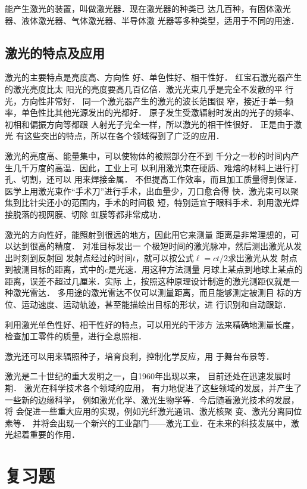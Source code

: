 能产生激光的装置，叫做激光器．现在激光器的种类已
达几百种，有固体激光器、液体激光器、气体激光器、半导体激
光器等多种类型，适用于不同的用途．

\subsection{激光的特点及应用}

激光的主要特点是亮度高、方向性
好、单色性好、相干性好．
红宝石激光器产生的激光亮度比太
阳光的亮度要高几百亿倍．激光光束几乎是完全不发散的平
行光，方向性非常好．
同一个激光器产生的激光的波长范围很
窄，接近于单一频率，单色性比其他光源发出的光都好．
原子发生受激辐射时发出的光子的频率、初相和偏振方向等都跟
人射光子完全一样，所以激光的相干性很好．
正是由于激光
有这些突出的特点，所以在各个领域得到了广泛的应用．

激光的亮度高、能量集中，可以使物体的被照部分在不到
千分之一秒的时间内产生几千万度的高温．因此，工业上可
以利用激光束在硬质、难熔的材料上进行打孔、切割，还可以
用来焊接金属．
不但提高工作效率，而且加工质量得到保证．
医学上用激光束作“手术刀”进行手术，出血量少，刀口愈合得
快．激光束可以聚焦到比针尖还小的范围内，手术的时间极
短，特别适宜于眼科手术．利用激光焊接脱落的视网膜、切除
虹膜等都非常成功．

激光的方向性好，能照射到很远的地方，因此用它来测量
距离是非常理想的，可以达到很高的精度．
对准目标发出一
个极短时间的激光脉冲，然后测出激光从发出时刻到反射回
发射点经过的时间$t$，就可以按公式$\ell=ct/2$求出激光从发
射点到被测目标的距离，式中的$c$是光速．用这种方法测量
月球上某点到地球上某点的距离，误差不超过几厘米．实际
上，按照这种原理设计制造的激光测距仪就是一种激光雷达．
多用途的激光雷达不仅可以测量距离，而且能够测定被测目
标的方位、运动速度、运动轨迹，甚至能描绘出目标的形状，进
行识别和自动跟踪．

利用激光单色性好、相干性好的特点，可以用光的干涉方
法来精确地测量长度，检查加工零件的质量，进行全息照相．

激光还可以用来辐照种子，培育良利，控制化学反应，用
于舞台布景等．

激光是二十世纪的重大发明之一，自1960年出现以来，
目前还处在迅速发展时期．
激光在科学技术各个领域的应用，
有力地促进了这些领域的发展，并产生了一些新的边缘科学，
例如激光化学、激光生物学等．今后随着激光技术的发展，将
会促进一些重大应用的实现，例如光纤激光通讯、激光核聚
变、激光分离同位素等．
并将会出现一个新兴的工业部门——激光工业．在未来的科技发展中，激光起着重要的作用．

\section*{复习题}

